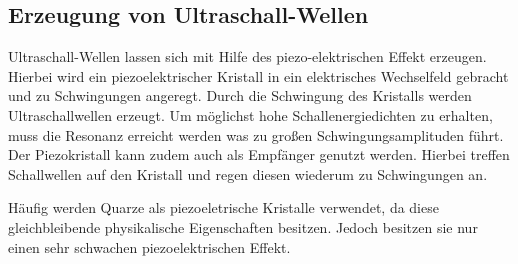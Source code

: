 \subsection{Erzeugung von Ultraschall-Wellen}
Ultraschall-Wellen lassen sich mit Hilfe des piezo-elektrischen Effekt erzeugen.
Hierbei wird ein piezoelektrischer Kristall in ein elektrisches Wechselfeld
gebracht und zu Schwingungen angeregt. Durch die Schwingung des Kristalls werden
Ultraschallwellen erzeugt. Um möglichst hohe Schallenergiedichten zu erhalten,
muss die Resonanz erreicht werden was zu großen Schwingungsamplituden führt.
Der Piezokristall kann zudem auch als Empfänger genutzt werden. Hierbei treffen
Schallwellen auf den Kristall und regen diesen wiederum zu Schwingungen an.

Häufig werden Quarze als piezoeletrische Kristalle verwendet, da diese
gleichbleibende physikalische Eigenschaften besitzen. Jedoch besitzen sie nur
einen sehr schwachen piezoelektrischen Effekt.
